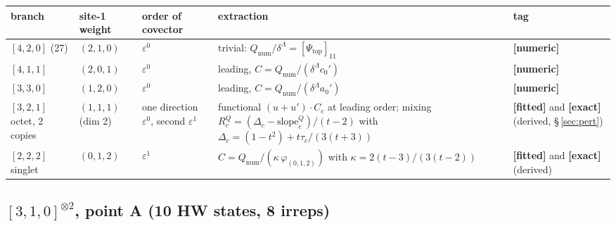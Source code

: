 \documentclass[10pt]{article}
\begin{document}
\begin{center}\footnotesize\setlength{\tabcolsep}{3pt}\begin{longtable}{@{}p{2.9cm}p{1.9cm}p{2.7cm}p{5.6cm}p{2.4cm}@{}}\toprule
\textbf{branch} & \textbf{site-1 weight} & \textbf{order of covector} & \textbf{extraction} & \textbf{tag} \\\midrule\endhead
$[4,2,0]$ (27) & $(2,1,0)$ & $\varepsilon^0$ & trivial: $Q_{\mathrm{num}}/\delta^\Lambda=[\Psi_{\mathrm{top}}]_{11}$ & \textbf{[numeric]} \\
$[4,1,1]$ & $(2,0,1)$ & $\varepsilon^0$ & leading, $C=Q_{\mathrm{num}}/(\delta^\Lambda c_0')$ & \textbf{[numeric]} \\
$[3,3,0]$ & $(1,2,0)$ & $\varepsilon^0$ & leading, $C=Q_{\mathrm{num}}/(\delta^\Lambda a_0')$ & \textbf{[numeric]} \\
$[3,2,1]$ octet, 2 copies & $(1,1,1)$ (dim 2) & one direction $\varepsilon^0$, second $\varepsilon^1$ & functional $(u+u')\cdot C_c$ at leading order; mixing $R_c^Q=(\Delta_c-\mathrm{slope}_c^Q)/(t-2)$ with $\Delta_c=(1-t^2)+t\tau_c/(3(t+3))$ & \textbf{[fitted]} and \textbf{[exact]} (derived, \S\,\ref{sec:pert}) \\
$[2,2,2]$ singlet & $(0,1,2)$ & $\varepsilon^1$ & $C=Q_{\mathrm{num}}/(\kappa\,\varphi_{(0,1,2)})$ with $\kappa=2(t-3)/(3(t-2))$ & \textbf{[fitted]} and \textbf{[exact]} (derived) \\
\bottomrule\end{longtable}\end{center}

\subsection{$[3,1,0]^{\otimes2}$, point A (10 HW states, 8 irreps)}
\end{document}
